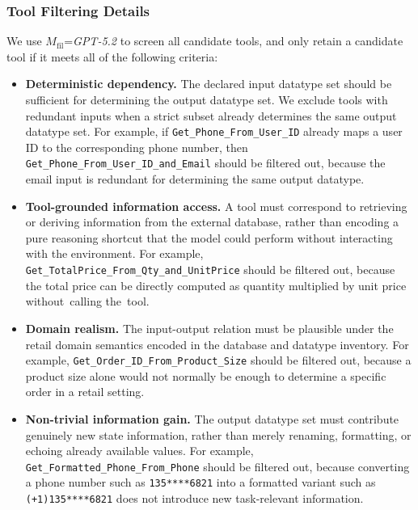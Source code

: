 \subsubsection{Tool Filtering Details}
\label{app:detailed-filtering-criteria}


We use $M_{\mathrm{fil}}$=\textit{GPT-5.2} to screen all candidate tools, and only retain a candidate tool if it meets all of the following criteria:
\begin{itemize}
    \item \textbf{Deterministic dependency.} The declared input datatype set should be sufficient for determining the output datatype set. We exclude tools with redundant inputs when a strict subset already determines the same output datatype set. For example, if \texttt{Get\_Phone\_From\_User\_ID} already maps a user ID to the corresponding phone number, then \texttt{Get\_Phone\_From\_User\_ID\_and\_Email} should be filtered out, because the email input is redundant for determining the same output datatype.
    \item \textbf{Tool-grounded information access.} A tool must correspond to retrieving or deriving information from the external database, rather than encoding a pure reasoning shortcut that the model could perform without interacting with the environment. For example, \texttt{Get\_TotalPrice\_From\_Qty\_and\_UnitPrice} should be filtered out, because the total price can be directly computed as quantity multiplied by unit price without~calling the~tool.
    \item \textbf{Domain realism.} The input-output relation must be plausible under the retail domain semantics encoded in the database and datatype inventory. For example, \texttt{Get\_Order\_ID\_From\_Product\_Size} should be filtered out, because a product size alone would not normally be enough to determine a specific order in a retail setting.
    \item \textbf{Non-trivial information gain.} The output datatype set must contribute genuinely new state information, rather than merely renaming, formatting, or echoing already available values. For example, \texttt{Get\_Formatted\_Phone\_From\_Phone} should be filtered out, because converting a phone number such as \texttt{135****6821} into a formatted variant such as \texttt{(+1)135****6821} does not introduce new task-relevant information.
\end{itemize}

